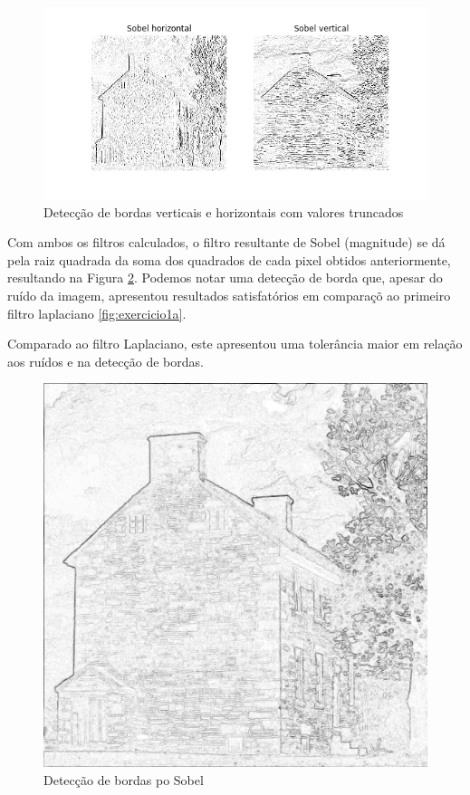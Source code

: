 \documentclass{article}
\begin{document}
\begin{figure}[h!]
    \includegraphics[width=\linewidth]{results/sobelclip.png}
    \caption{Detecção de bordas verticais e horizontais com valores truncados}
    \label{fig:exercicio1c}
\end{figure}

Com ambos os filtros calculados, o filtro resultante de Sobel (magnitude) se dá pela raiz quadrada da soma dos quadrados de cada pixel obtidos anteriormente, resultando na Figura \ref{fig:exercicio1cfinal}.
Podemos notar uma detecção de borda que, apesar do ruído da imagem, apresentou resultados satisfatórios em comparaçõ ao primeiro filtro laplaciano \ref{fig:exercicio1a}.

Comparado ao filtro Laplaciano, este apresentou uma tolerância maior em relação aos ruídos e na detecção de bordas.

\begin{figure}[h!]
    \includegraphics[width=\linewidth]{results/exercicio1c.png}
    \caption{Detecção de bordas po Sobel}
    \label{fig:exercicio1cfinal}
\end{figure}
\end{document}
